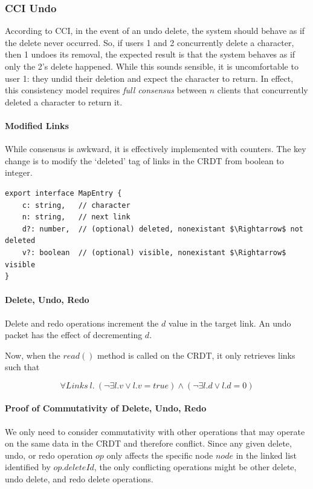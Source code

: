 \documentclass[12pt,a4paper,twoside,openright]{report}
\begin{document}
		\subsubsection{CCI Undo} \label{sec:cciundo}
		According to CCI, in the event of an undo delete, the system should behave as if the delete never occurred. So, if users 1 and 2 concurrently delete a character, then 1 undoes its removal, the expected result is that the system behaves as if only the 2's delete happened. While this sounds sensible, it is uncomfortable to user 1: they undid their deletion and expect the character to return. In effect, this consistency model requires \textit{full consensus} between $n$ clients that concurrently deleted a character to return it.
		
			\paragraph{Modified Links}
			While consensus is awkward, it is effectively implemented with counters. The key change is to modify the `deleted' tag of links in the CRDT from boolean to integer.
			
\begin{lstlisting}[caption={New Type Signature of a Link in the CRDT}, mathescape=true]
export interface MapEntry {
	c: string,   // character
	n: string,   // next link
	d?: number,  // (optional) deleted, nonexistant $\Rightarrow$ not deleted
	v?: boolean  // (optional) visible, nonexistant $\Rightarrow$ visible
}
\end{lstlisting}

			\paragraph{Delete, Undo, Redo}
			Delete and redo operations increment the $d$ value in the target link. An undo packet has the effect of decrementing $d$.
			
			Now, when the $read()$ method is called on the CRDT, it only retrieves links such that
			
				\[\forall Links\ l.\  (\lnot\exists l.v \lor l.v = true) \land (\lnot\exists l.d \lor l.d = 0 ) \] 
			
			\paragraph{Proof of Commutativity of Delete, Undo, Redo}
			We only need to consider commutativity with other operations that may operate on the same data in the CRDT and therefore conflict. Since any given delete, undo, or redo operation $op$ only affects the specific node $node$ in the linked list identified by $op.deleteId$, the only conflicting operations might be other delete, undo delete, and redo delete operations.
			
\end{document}

